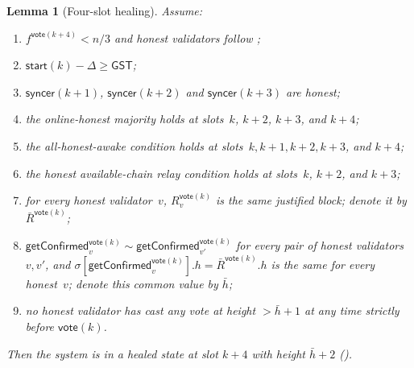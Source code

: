 \ifx\litemode\undefined\documentclass{article}\fi
\newcommand{\syncer}{\mathsf{syncer}}
\newcommand{\start}{\mathsf{start}}
\newcommand{\vote}{\mathsf{vote}}
\newcommand{\comm}[1]{\bar{#1}}
\newcommand{\getConfirmed}{\textsf{getConfirmed}\xspace}
\theoremstyle{plain}
\newtheorem{lemma}{Lemma}
\theoremstyle{definition}
\theoremstyle{remark}
\newcommand{\GST}{\ensuremath{\mathsf{GST}}}
\newcommand{\OHM}{online-honest majority\xspace}
\newcommand{\HAR}{honest available-chain relay\xspace}
\newcommand{\AHA}{all-honest-awake\xspace}
\begin{document}
\begin{lemma}[Four-slot healing]\label{rev:lem:healing-four-slot}
Assume:
\begin{enumerate}
  \item $f^{\vote(k+4)} < n/3$ and honest validators follow ;
  \item $\start(k) - \Delta \geq \GST$;
  \item $\syncer(k+1)$, $\syncer(k+2)$ and $\syncer(k+3)$ are honest;
  \item the \OHM holds at slots~$k$, $k+2$, $k+3$, and $k+4$;
  \item the \AHA condition holds at slots~$k, k+1, k+2, k+3$, and $k+4$;
  \item the \HAR condition holds at slots~$k$, $k+2$, and $k+3$;
  \item for every honest validator~$v$, $R_v^{\vote(k)}$ is the same justified block; denote it by $\comm{R}^{\vote(k)}$;
  \item $\getConfirmed_v^{\vote(k)} \sim \getConfirmed_{v'}^{\vote(k)}$ for every pair of honest validators~$v, v'$, and $\sigma[\getConfirmed_v^{\vote(k)}].h = \comm{R}^{\vote(k)}.h$ is the same for every honest~$v$; denote this common value by $\comm{h}$;
  \item no honest validator has cast any vote at height $> \comm{h}+1$ at any time strictly before $\vote(k)$.
\end{enumerate}
Then the system is in a healed state at slot $k+4$ with height $\comm{h}+2$ ().
\end{lemma}
\end{document}
